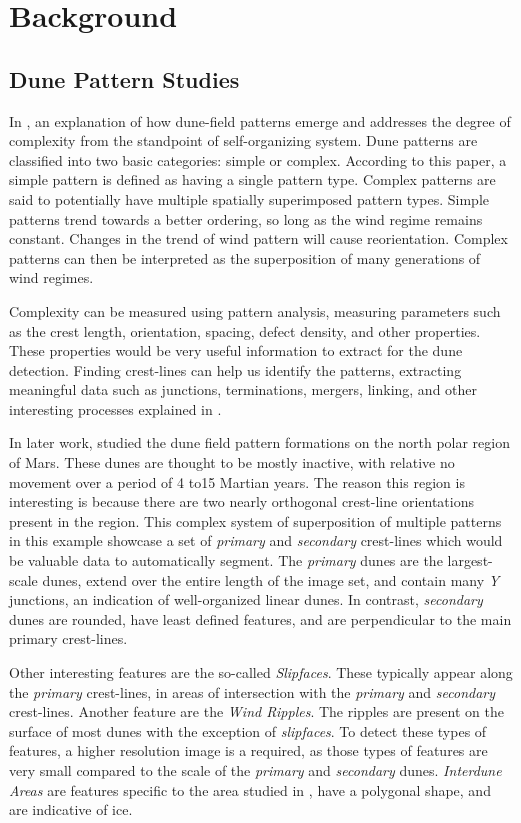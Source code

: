 \section{Background}
\subsection{Dune Pattern Studies}

In \cite{Kocurek_Ewing}, an explanation of how dune-field patterns emerge and addresses the degree of complexity from the standpoint of self-organizing system. Dune patterns are classified into two basic categories: simple or complex. According to this paper, a simple pattern is defined as having a single pattern type. Complex patterns are said to potentially have multiple spatially superimposed pattern types. Simple patterns trend towards a better ordering, so long as the wind regime remains constant. Changes in the trend of wind pattern will cause reorientation. Complex patterns can then be interpreted as the superposition of many generations of wind regimes.

Complexity can be measured using pattern analysis, measuring parameters such as the crest length, orientation, spacing,	defect density, and other properties. These properties would be very useful information to extract for the dune detection. Finding crest-lines	can help us identify the patterns, extracting meaningful data such as junctions, terminations, mergers, linking, and other interesting processes explained in \cite{Kocurek_Ewing}.

In later work, \cite{Ewing_Peyret_Kocurek_Bourke} studied the dune field pattern formations on the north polar region of Mars. These dunes are thought to be mostly inactive, with relative	no movement over a period of 4 to15 Martian years. The reason this region is interesting is because there are two nearly orthogonal crest-line orientations present in the region. This complex system of superposition of multiple patterns in this example showcase a set of \emph{primary} and \emph{secondary} crest-lines which would be valuable data to automatically segment. The \emph{primary}	dunes are the largest-scale dunes, extend over the entire length of the image set, and contain many \emph{Y} junctions,	an indication of well-organized linear dunes. In contrast, \emph{secondary} dunes are rounded, have least defined features, and are perpendicular	to the main primary crest-lines.

Other interesting features are the so-called \emph{Slipfaces}. These typically appear along the \emph{primary} crest-lines, in areas of intersection with the \emph{primary} and \emph{secondary} crest-lines. Another feature are the \emph{Wind Ripples}. The ripples are present on the surface of most dunes with the exception	of \emph{slipfaces}. To detect	these types of features, a higher resolution image is a required, as those types of features are very small compared to the scale of the \emph{primary} and \emph{secondary}	dunes. \emph{Interdune Areas} are features specific to the area studied in \cite{Ewing_Peyret_Kocurek_Bourke},	have a polygonal shape, and are indicative of ice.

